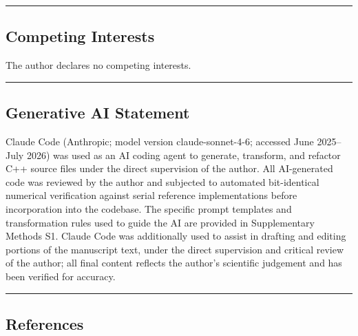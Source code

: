 \documentclass[
  11pt,
]{article}
\begin{document}
\begin{center}\rule{0.5\linewidth}{0.5pt}\end{center}

\subsection{Competing Interests}\label{competing-interests}

The author declares no competing interests.

\begin{center}\rule{0.5\linewidth}{0.5pt}\end{center}

\subsection{Generative AI Statement}\label{generative-ai-statement}

Claude Code (Anthropic; model version claude-sonnet-4-6; accessed June
2025--July 2026) was used as an AI coding agent to generate, transform,
and refactor C++ source files under the direct supervision of the
author. All AI-generated code was reviewed by the author and subjected
to automated bit-identical numerical verification against serial
reference implementations before incorporation into the codebase. The
specific prompt templates and transformation rules used to guide the AI
are provided in Supplementary Methods S1. Claude Code was additionally
used to assist in drafting and editing portions of the manuscript text,
under the direct supervision and critical review of the author; all
final content reflects the author's scientific judgement and has been
verified for accuracy.

\begin{center}\rule{0.5\linewidth}{0.5pt}\end{center}

\subsection{References}\label{references}
\end{document}
